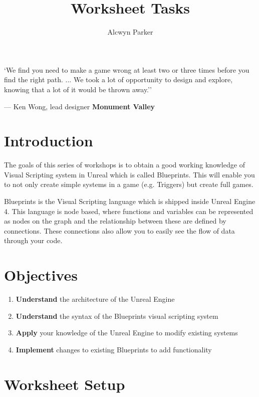 \documentclass{../../../fal_assignment}
\title{Worksheet Tasks}
\author{Alcwyn Parker} %
\begin{document}
\maketitle

\begin{marginquote}
`We find you need to make a game wrong at least two or three times before you find the right path. ...
We took a lot of opportunity to design and explore, knowing that a lot of it would be thrown away.''
\par --- Ken Wong, lead designer \textbf{Monument Valley}
\end{marginquote}


\section*{Introduction}
The goals of this series of workshops is to obtain a good working knowledge of Visual Scripting system in Unreal which is called Blueprints. This will enable you to not only create simple systems in a game (e.g. Triggers) but create full games.

Blueprints is the Visual Scripting language which is shipped inside Unreal Engine 4. This language is node based, where functions and variables can be represented as nodes on the graph and the relationship between these are defined by connections. These connections also allow you to easily see the flow of data through your code.

\section*{Objectives}
\begin{enumerate}[label=(\Alph*)]
	\item \textbf{Understand} the architecture of the Unreal Engine
	\item \textbf{Understand} the syntax of the Blueprints visual scripting system
	\item \textbf{Apply} your knowledge of the Unreal Engine to modify existing systems
	\item \textbf{Implement} changes to existing Blueprints to add functionality
\end{enumerate}

\section*{Worksheet Setup}
\end{document}
